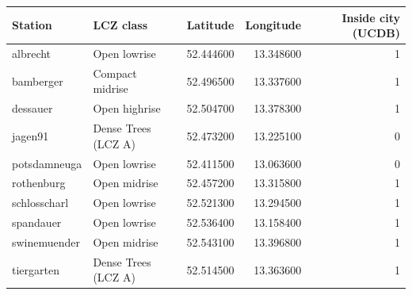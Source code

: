 \begin{tabular}{llrrr}
\toprule
Station & LCZ class & Latitude & Longitude & Inside city (UCDB) \\
\midrule
albrecht & Open lowrise & 52.444600 & 13.348600 & 1 \\
bamberger & Compact midrise & 52.496500 & 13.337600 & 1 \\
dessauer & Open highrise & 52.504700 & 13.378300 & 1 \\
jagen91 & Dense Trees (LCZ A) & 52.473200 & 13.225100 & 0 \\
potsdamneuga & Open lowrise & 52.411500 & 13.063600 & 0 \\
rothenburg & Open midrise & 52.457200 & 13.315800 & 1 \\
schlosscharl & Open lowrise & 52.521300 & 13.294500 & 1 \\
spandauer & Open lowrise & 52.536400 & 13.158400 & 1 \\
swinemuender & Open midrise & 52.543100 & 13.396800 & 1 \\
tiergarten & Dense Trees (LCZ A) & 52.514500 & 13.363600 & 1 \\
\bottomrule
\end{tabular}
